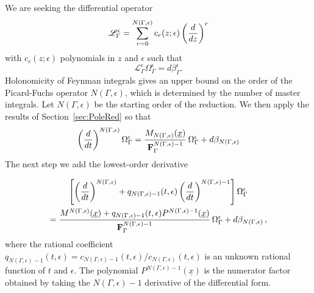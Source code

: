 \documentclass[a4paper,12pt]{article}
\numberwithin{equation}{section}
\numberwithin{figure}{section}
\begin{document}
We are seeking the differential operator 
\begin{equation}\label{e:PFgeneric}
  \mathscr{L}_\Gamma^\epsilon=\sum_{r=0}^{N(\Gamma,\epsilon)}
  c_r(z;\epsilon) \left(d\over dz\right)^r
\end{equation}
with $c_r(z;\epsilon)$ polynomials in $z$ and $\epsilon$ such that
\begin{equation}
     \mathscr{L}_\Gamma^\epsilon \Omega_\Gamma^\epsilon= d\beta^\epsilon_\Gamma.
   \end{equation}
%
Holonomicity of Feynman integrals gives an upper bound on the order of the Picard-Fuchs operator $N(\Gamma,\epsilon)$, which is  determined by
 the number of master
integrals. Let $N(\Gamma,\epsilon)$  be the starting order of the
reduction.  We then apply the results of Section~\ref{sec:PoleRed} so that
%
\begin{equation}\label{e:step1}
\left(d\over dt\right)^{N(\Gamma,\epsilon)} \Omega_\Gamma^\epsilon= {M_{
      N(\Gamma,\epsilon)}(\underline x)\over
    \textbf{F}_\Gamma^{N(\Gamma,\epsilon)-1}
  } \,\Omega_\Gamma^\epsilon+ d\beta_{N(\Gamma,\epsilon)}  
\end{equation}
%
The next step we add the lowest-order derivative

\begin{multline}\label{e:step2}
\left[\left(d\over dt\right)^{N(\Gamma,\epsilon)}
  +q_{N(\Gamma,\epsilon)-1}(t,\epsilon) \left(d\over dt\right)^{N(\Gamma,\epsilon)-1}\right] \Omega_\Gamma^\epsilon\cr= {M^{
      N(\Gamma,\epsilon)}(\underline x)+q_{N(\Gamma,\epsilon)-1}(t,\epsilon)
    P^{N(\Gamma,\epsilon)-1}(\underline x) \over
    \textbf{F}_\Gamma^{N(\Gamma,\epsilon)-1}
  }\,\Omega_\Gamma^\epsilon+ d\beta_{N(\Gamma,\epsilon)}\, ,  
\end{multline}
where the rational coefficient
$q_{N(\Gamma,\epsilon)-1}(t,\epsilon)=c_{N(\Gamma,\epsilon)-1}(t,\epsilon)/c_{N(\Gamma,\epsilon)}(t,\epsilon)$
is an unknown rational function of $t$ and $\epsilon$. 
The polynomial $ P^{N(\Gamma,\epsilon)-1}(\underline x) $
is the numerator factor obtained by taking the $N(\Gamma,\epsilon)-1$
derivative of the differential form.
\end{document}
